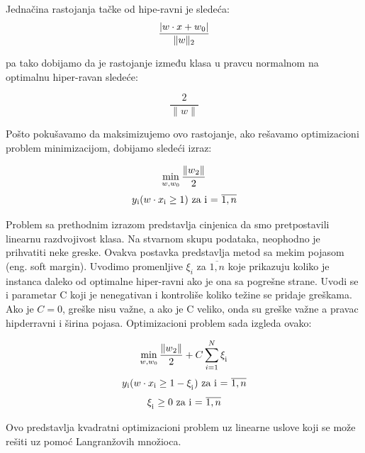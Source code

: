 \documentclass[12pt,oneside]{memoir}
\begin{document}
Jednačina rastojanja tačke od hipe-ravni je sledeća:
\begin{equation}
	\frac{|w \cdot x + w\textsubscript{0}|}{\|w\|\textsubscript{2}}
\end{equation}

pa tako dobijamo da je rastojanje između klasa u pravcu normalnom na optimalnu hiper-ravan sledeće:

\begin{equation}
	\frac{2}{\|w\|}
\end{equation}

Pošto pokušavamo da maksimizujemo ovo rastojanje,  ako rešavamo optimizacioni problem minimizacijom, dobijamo sledeći izraz:

\begin{equation}
	\min_{w,w_0} \frac{\|w\textsubscript{2}\|}{2} \\
\end{equation}
\begin{equation}
	y\textsubscript{i}(w \cdot x\textsubscript{i} \geq 1) \text{ za i = } \overline{1,n}
\end{equation}

Problem sa prethodnim izrazom predstavlja cinjenica da smo pretpostavili linearnu razdvojivost klasa.  Na stvarnom skupu podataka, neophodno je prihvatiti neke greske.  Ovakva postavka predstavlja metod sa mekim pojasom (eng. soft margin). 
Uvodimo promenljive $\xi_i$ za $\overline{1,n}$ koje prikazuju koliko je instanca daleko od optimalne hiper-ravni ako je ona sa pogrešne strane.  Uvodi se i parametar C koji je nenegativan i kontroliše koliko težine se pridaje greškama. Ako je $C=0$, greške nisu važne,  a ako je C veliko, onda su greške važne a pravac hipderravni i širina pojasa.  Optimizacioni problem sada izgleda ovako:

\begin{equation}
	\min_{w,w_0} \frac{\|w\textsubscript{2}\|}{2} + C \sum_{i=1}^{N} \xi_\textsubscript{i} \notag\\
\end{equation}
\begin{equation}
	y\textsubscript{i}(w \cdot x\textsubscript{i} \geq 1 - \xi_\textsubscript{i}) \text{ za i = } \overline{1,n} \notag\\
\end{equation}
\begin{equation}
	\xi_\textsubscript{i} \geq 0 \text{ za i = } \overline{1,n}
\end{equation}

Ovo predstavlja kvadratni optimizacioni problem uz linearne uslove koji se može rešiti uz pomoć Langranžovih množioca. 
\end{document}

